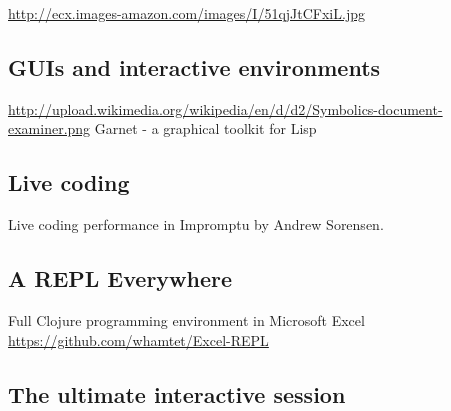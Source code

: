 \documentclass[11pt]{article}
\begin{document}
\url{http://ecx.images-amazon.com/images/I/51qjJtCFxiL.jpg}

\subsection*{GUIs and interactive environments}
\label{sec:orgheadline34}
\url{http://upload.wikimedia.org/wikipedia/en/d/d2/Symbolics-document-examiner.png}
Garnet - a graphical toolkit for Lisp
\subsection*{Live coding}
\label{sec:orgheadline35}
Live coding performance in Impromptu by Andrew Sorensen.
\subsection*{A REPL Everywhere}
\label{sec:orgheadline36}
Full Clojure programming environment in Microsoft Excel
\url{https://github.com/whamtet/Excel-REPL}
\subsection*{The ultimate interactive session}
\label{sec:orgheadline37}
\end{document}
